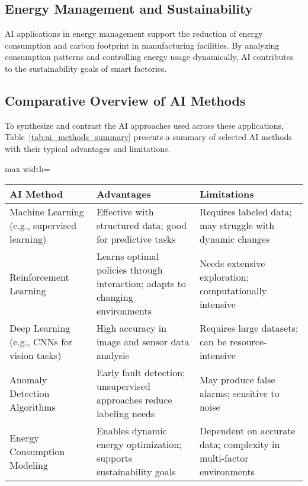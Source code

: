 \documentclass[sigconf]{acmart}
\begin{document}
\subsection{Energy Management and Sustainability}
AI applications in energy management support the reduction of energy consumption and carbon footprint in manufacturing facilities. By analyzing consumption patterns and controlling energy usage dynamically, AI contributes to the sustainability goals of smart factories.

\subsection{Comparative Overview of AI Methods}
To synthesize and contrast the AI approaches used across these applications, Table~\ref{tab:ai_methods_summary} presents a summary of selected AI methods with their typical advantages and limitations.

\begin{table*}[htbp]
\centering
\caption{Summary of AI Methods Applied in Smart and Sustainable Manufacturing}
\label{tab:ai_methods_summary}
\begin{adjustbox}{max width=\textwidth}
\begin{tabular}{@{}lll@{}}
\toprule
\textbf{AI Method} & \textbf{Advantages} & \textbf{Limitations} \\ \midrule
Machine Learning (e.g., supervised learning) & Effective with structured data; good for predictive tasks & Requires labeled data; may struggle with dynamic changes \\
Reinforcement Learning & Learns optimal policies through interaction; adapts to changing environments & Needs extensive exploration; computationally intensive \\
Deep Learning (e.g., CNNs for vision tasks) & High accuracy in image and sensor data analysis & Requires large datasets; can be resource-intensive \\
Anomaly Detection Algorithms & Early fault detection; unsupervised approaches reduce labeling needs & May produce false alarms; sensitive to noise \\
Energy Consumption Modeling & Enables dynamic energy optimization; supports sustainability goals & Dependent on accurate data; complexity in multi-factor environments \\ \bottomrule
\end{tabular}
\end{adjustbox}
\end{table*}
\end{document}
